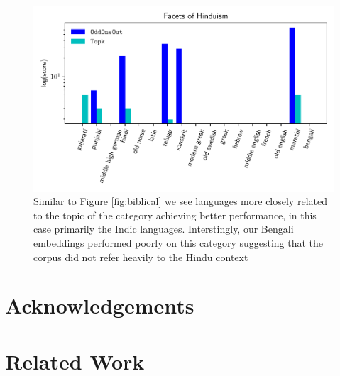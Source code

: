 \documentclass[11pt,a4paper]{article}
\begin{document}
\begin{figure}
\centering
\includegraphics{hinduism-raw.pdf} 
\caption{Similar to Figure \ref{fig:biblical} we see languages more closely related to the topic of the category achieving better performance, in this case primarily the Indic languages. 
Interstingly, our Bengali embeddings performed poorly on this category suggesting that the corpus did not refer heavily to the Hindu context}
\label{fig:hinduism}
\end{figure}


\section{Acknowledgements}
\label{sed:acknowledgements}

\section{Related Work}
\label{sec:related}



\end{document}
